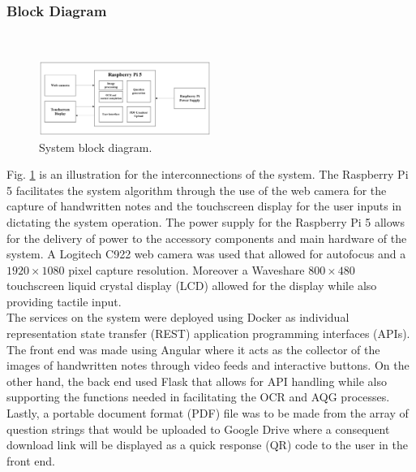 \documentclass[conference]{IEEEtran}
\begin{document}
\subsubsection{Block Diagram}
\hfill \\
\vspace{-0.4cm}
\begin{figure}[H]
\centerline{\includegraphics[width=0.5\textwidth]{blockdiag.png}}
\vspace{-0.4cm}
\caption{System block diagram.} 
\label{blockdiag}
\end{figure}
\indent Fig. \ref{blockdiag} is an illustration for the interconnections 
of the system. The Raspberry Pi 5 facilitates the system algorithm 
through the use of the web camera for the capture of handwritten notes and 
the touchscreen display for the user inputs in dictating the system 
operation. The power supply for the Raspberry Pi 5 allows for the delivery 
of power to the accessory components and main hardware of the system.
A Logitech C922 web camera was used that allowed for autofocus 
and a $1920\times 1080$ pixel capture resolution. Moreover a 
Waveshare $800\times480$ touchscreen liquid crystal display (LCD) 
allowed for the display while also providing tactile input.\\
\indent The services on the system were deployed using Docker as 
individual representation state transfer (REST) application programming 
interfaces (APIs). The front end was made using Angular where it acts 
as the collector of the images of handwritten notes through video feeds 
and interactive buttons. On the other hand, the back end used Flask 
that allows for API handling while also supporting the functions needed 
in facilitating the OCR and AQG processes. Lastly, a portable document 
format (PDF) file was to be made from the array of question strings that 
would be uploaded to Google Drive where a consequent download link 
will be displayed as a quick response (QR) code to the user in the 
front end.
\vspace{0.4cm}
\end{document}
